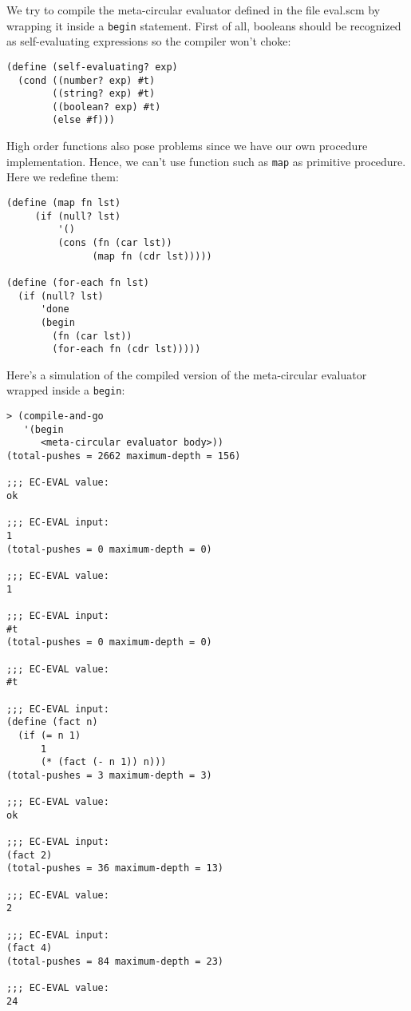 \documentclass[a4paper,12pt]{article}
\begin{document}
We try to compile the meta-circular evaluator defined in the file
eval.scm by wrapping it inside a \lstinline!begin! statement.  First
of all, booleans should be recognized  as self-evaluating expressions
so the compiler won't choke:
\begin{lstlisting}
(define (self-evaluating? exp)
  (cond ((number? exp) #t)
        ((string? exp) #t)
        ((boolean? exp) #t)
        (else #f)))
\end{lstlisting}

High order functions also pose problems since we have our own
procedure implementation.  Hence, we can't use function such as
\lstinline!map! as primitive procedure.  Here we redefine them:

\begin{lstlisting}
(define (map fn lst)
     (if (null? lst)
         '()
         (cons (fn (car lst))
               (map fn (cdr lst)))))

(define (for-each fn lst)
  (if (null? lst)
      'done
      (begin
        (fn (car lst))
        (for-each fn (cdr lst)))))
\end{lstlisting}

Here's a simulation of the compiled version of the meta-circular
evaluator wrapped inside a \lstinline!begin!:

\begin{lstlisting}
> (compile-and-go
   '(begin
      <meta-circular evaluator body>))
(total-pushes = 2662 maximum-depth = 156)

;;; EC-EVAL value:
ok

;;; EC-EVAL input:
1
(total-pushes = 0 maximum-depth = 0)

;;; EC-EVAL value:
1

;;; EC-EVAL input:
#t
(total-pushes = 0 maximum-depth = 0)

;;; EC-EVAL value:
#t

;;; EC-EVAL input:
(define (fact n)
  (if (= n 1)
      1
      (* (fact (- n 1)) n)))
(total-pushes = 3 maximum-depth = 3)

;;; EC-EVAL value:
ok

;;; EC-EVAL input:
(fact 2)
(total-pushes = 36 maximum-depth = 13)

;;; EC-EVAL value:
2

;;; EC-EVAL input:
(fact 4)
(total-pushes = 84 maximum-depth = 23)

;;; EC-EVAL value:
24
\end{lstlisting}
\end{document}
